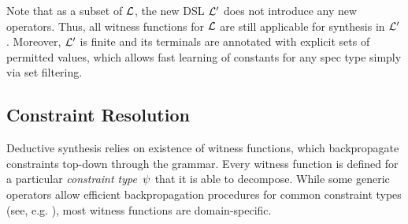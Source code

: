 Note that as a subset of $\mathcal{L}$, the new DSL $\mathcal{L}'$ does not introduce any new operators.
Thus, all witness functions for $\mathcal{L}$ are still applicable for synthesis in $\mathcal{L}'$.
Moreover, $\mathcal{L}'$ is finite and its terminals are annotated with explicit sets of permitted values, which allows fast learning of constants
for any spec type simply via set filtering.

\subsection{Constraint Resolution}
Deductive synthesis relies on existence of witness functions, which backpropagate constraints top-down through the
grammar.
Every witness function is defined for a particular \emph{constraint type}~$\psi$ that it is able to decompose.
While some generic operators allow efficient backpropagation procedures for common constraint types (see, e.g.
\cite{pldi15:swarat,flashextract}), most witness functions are domain-specific.

